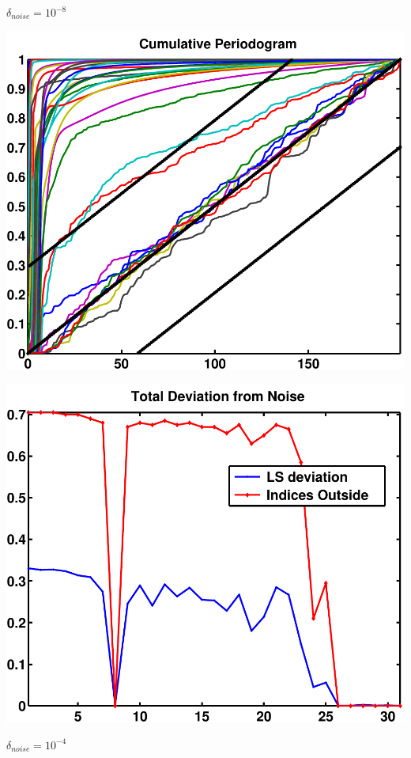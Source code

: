 \documentclass[11pt]{amsart}
\begin{document}
	\vspace{5mm}
	{\centering $\delta_{noise}=10^{-8}$}
	
	\vspace{5mm}
	\begin{minipage}[t]{0.5\textwidth}
	
		\includegraphics[width=.95\linewidth]{figures/run3/cum_per} 
   
	\end{minipage}
	\begin{minipage}[t]{0.5\textwidth}
	
		\includegraphics[width=.95\linewidth]{figures/run3/total_deviation} 
   
	\end{minipage}
	\vspace{5mm}
	{\centering $\delta_{noise}=10^{-4}$}
	
\end{document}

